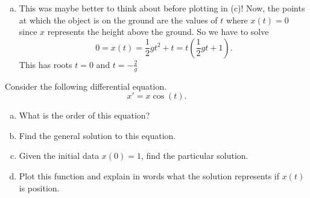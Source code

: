 \documentclass[12pt]{article} %
\begin{document}
\begin{solution}
\begin{enumerate}[(a)]
\begin{figure}[H]
    \end{figure}
    \item This was maybe better to think about before plotting in (c)! Now, the points at which the object is on the ground are the values of $t$ where $x(t)=0$ since $x$ represents the height above the ground.  So we have to solve
    \[
    0=x(t)=\frac{1}{2}gt^2+t=t\left(\frac{1}{2}gt+1\right).
    \]
    This has roots $t=0$ and $t=-\frac{2}{g}$
\end{enumerate}
\end{solution}


\newpage
\begin{problem}
Consider the following differential equation.
\[
x' = x\cos(t).
\]
\begin{enumerate}[(a)]
    \item What is the order of this equation?
    \item Find the general solution to this equation.
    \item Given the initial data $x(0)=1$, find the particular solution.
    \item Plot this function and explain in words what the solution represents if $x(t)$ is position.
\end{enumerate}
\end{problem}
\end{document}

